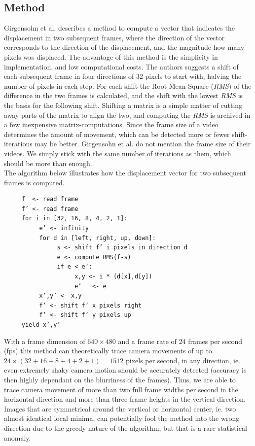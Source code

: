 \documentclass[12pt]{article}
\begin{document}
\subsection{Method}
Girgensohn et al. \cite{Girgensohn:2000:SAH:354401.354415} describes a method to compute a vector that indicates the displacement in two subsequent frames, where the direction of the vector corresponds to the direction of the displacement, and the magnitude how many pixels was displaced. The advantage of this method is the simplicity in implementation, and low computational costs. The authors suggests a shift of each subsequent frame in four directions of 32 pixels to start with, halving the number of pixels in each step. For each shift the Root-Mean-Square (\textit{RMS}) of the difference in the two frames is calculated, and the shift with the lowest \textit{RMS} is the basis for the following shift. Shifting a matrix is a simple matter of cutting away parts of the matrix to align the two, and computing the \textit{RMS} is archived in a few inexpensive matrix-computations. Since the frame size of a video determines the amount of movement, which can be detected more or fewer shift-iterations may be better. Girgensohn et al. \cite{Girgensohn:2000:SAH:354401.354415} do not mention the frame size of their videos. We simply stick with the same number of iterations as them, which should be more than enough.\\
The algorithm below illustrates how the displacement vector for two subsequent frames is computed.
%
\begin{verbatim}
     f  <- read frame
     f’ <- read frame
     for i in [32, 16, 8, 4, 2, 1]:
          e’ <- infinity
          for d in [left, right, up, down]:
               s <- shift f’ i pixels in direction d
               e <- compute RMS(f-s)
               if e < e’:
                    x,y <- i * (d[x],d[y])
                    e’   <- e
          x’,y’ <- x,y
          f’ <- shift f’ x pixels right
          f’ <- shift f’ y pixels up
     yield x’,y’
\end{verbatim}
%
With a frame dimension of $640\times480$ and a frame rate of 24 frames per second (fps) this method can theoretically trace camera movements of up to $24 \times (32+16+8+4+2+1) = 1512$ pixels per second, in any direction, ie. even extremely shaky camera motion should be accurately detected (accuracy is then highly dependant on the blurriness of the frames). Thus, we are able to trace camera movement of more than two full frame widths per second in the horizontal direction and more than three frame heights in the vertical direction. Images that are symmetrical around the vertical or horizontal center, ie. two almost identical local minima, can potentially fool the method into the wrong direction due to the greedy nature of the algorithm, but that is a rare statistical anomaly.\\
\end{document}
